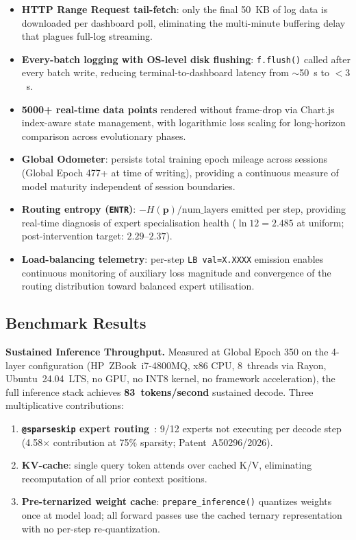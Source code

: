 \documentclass[journal,10pt,twocolumn]{IEEEtran}
\begin{document}
\begin{itemize}
  \item \textbf{HTTP Range Request tail-fetch}: only the final 50~KB of log
        data is downloaded per dashboard poll, eliminating the multi-minute
        buffering delay that plagues full-log streaming.
  \item \textbf{Every-batch logging with OS-level disk flushing}:
        \texttt{f.flush()} called after every batch write, reducing terminal-to-dashboard
        latency from $\sim$50~s to ${<}3$~s.
  \item \textbf{5000+ real-time data points} rendered without frame-drop via
        Chart.js index-aware state management, with logarithmic loss scaling
        for long-horizon comparison across evolutionary phases.
  \item \textbf{Global Odometer}: persists total training epoch mileage across
        sessions (Global Epoch 477+ at time of writing), providing a
        continuous measure of model maturity independent of session boundaries.
  \item \textbf{Routing entropy (\texttt{ENTR})}: $-H(\mathbf{p})/\text{num\_layers}$
        emitted per step, providing real-time diagnosis of expert specialisation
        health ($\ln 12 = 2.485$ at uniform; post-intervention target:
        $2.29$--$2.37$).
  \item \textbf{Load-balancing telemetry}: per-step \texttt{LB val=X.XXXX}
        emission enables continuous monitoring of auxiliary loss magnitude and
        convergence of the routing distribution toward balanced expert
        utilisation.
\end{itemize}

\subsection{Benchmark Results}
\label{subsec:albert_benchmarks}

\textbf{Sustained Inference Throughput.}
Measured at Global Epoch 350 on the 4-layer configuration
(HP~ZBook~i7-4800MQ, x86 CPU, 8~threads via Rayon, Ubuntu~24.04~LTS,
no GPU, no INT8 kernel, no framework acceleration), the full inference
stack achieves \textbf{83~tokens/second} sustained decode.
Three multiplicative contributions:

\begin{enumerate}
  \item \textbf{\texttt{@sparseskip} expert routing}~\cite{sparseskip2026}:
        9/12 experts not executing per decode step (4.58$\times$ contribution
        at 75\% sparsity; Patent~A50296/2026).
  \item \textbf{KV-cache}: single query token attends over cached K/V,
        eliminating recomputation of all prior context positions.
  \item \textbf{Pre-ternarized weight cache}: \texttt{prepare\_inference()}
        quantizes weights once at model load; all forward passes use the
        cached ternary representation with no per-step re-quantization.
\end{enumerate}
\end{document}

